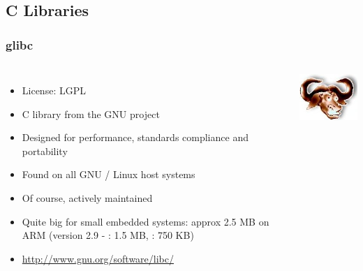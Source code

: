 \subsection{C Libraries}
\begin{frame}
  \frametitle{glibc}
  \begin{columns}
    \begin{itemize}
    \item License: LGPL
    \item C library from the GNU project
    \item Designed for performance, standards compliance and portability
    \item Found on all GNU / Linux host systems
    \item Of course, actively maintained
    \item Quite big for small embedded systems: approx 2.5 MB on ARM
      (version 2.9 - : 1.5 MB, : 750 KB)
    \item \url{http://www.gnu.org/software/libc/}
    \end{itemize}
    \includegraphics[width=\textwidth]{slides/sysdev-toolchains-c-libraries/glibc.png}
  \end{columns}
\end{frame}

